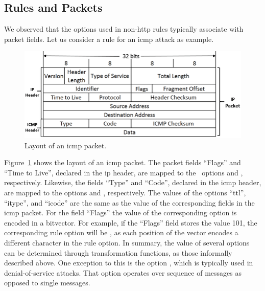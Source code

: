 \documentclass[conference]{IEEEtran}
\begin{document}
\subsection{Rules and Packets}
\label{sec:rules-and-packets}


We observed that the options used in non-http rules typically
associate with packet fields. Let us consider a rule for an icmp
attack as example.

\begin{figure}[h!]
  \centering
  \vspace{-2ex}  
  \includegraphics[scale=0.27]{figs/ICMP-packet-structure.png}
  \vspace{-1ex}
  \caption{Layout of an icmp packet.}
  \vspace{-1ex}
  \label{fig:icmp-packet-layout}
\end{figure}

Figure~\ref{fig:icmp-packet-layout} shows the
layout of an icmp packet. The packet fields ``Flags'' and ``Time to
Live'', declared in the ip header, are mapped to the \suri\ options
 and , respectively. Likewise, the fields
``Type'' and ``Code'', declared in the icmp header, are mapped to the
options  and , respectively. The values of
the options ``ttl'', ``itype'', and ``icode'' are the same as the
value of the corresponding fields in the icmp packet. For the field
``Flags'' the value of the corresponding option is encoded in a
bitvector. For example, if the ``Flags'' field stores the value 101,
the corresponding rule option will be , as each
position of the vector encodes a different character in the
 rule option. In summary, the value of several
options can be determined through transformation functions, as those
informally described above. One exception to this is the option
, which is typically used in denial-of-service
attacks. That option operates over sequence of messages as opposed to
single messages.
\end{document}
